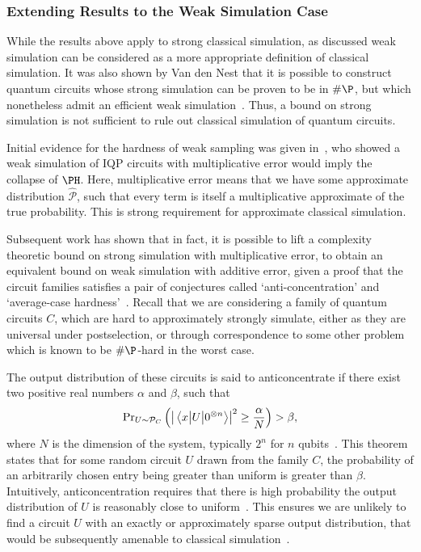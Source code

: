 \subsubsection*{Extending Results to the Weak Simulation Case}
While the results above apply to strong classical simulation, as discussed weak simulation can be considered as a more appropriate definition of classical simulation. It was also shown by Van den Nest that it is possible to construct quantum circuits whose strong simulation can be proven to be in $\#\P$, but which nonetheless admit an efficient weak simulation~\cite{VandenNest2008}. Thus, a bound on strong simulation is not sufficient to rule out classical simulation of quantum circuits.\par
Initial evidence for the hardness of weak sampling was given in~\cite{Bremner2011}, who showed a weak simulation of IQP circuits with multiplicative error would imply the collapse of $\PH$. Here, multiplicative error means that we have some approximate distribution $\hat{\mathcal{P}}$, such that every term is itself a multiplicative approximate of the true probability. This is strong requirement for approximate classical simulation.\par
Subsequent work has shown that in fact, it is possible to lift a complexity theoretic bound on strong simulation with multiplicative error, to obtain an equivalent bound on weak simulation with additive error, given a proof that the circuit families satisfies a pair of conjectures called `anti-concentration' and `average-case hardness'~\cite{Hangleiter2017}. Recall that we are considering a family of quantum circuits $C$, which are hard to approximately strongly simulate, either as they are universal under postselection, or through correspondence to some other problem which is known to be $\#\P$-hard in the worst case.\par
The output distribution of these circuits is said to anticoncentrate if there exist two positive real numbers $\alpha$ and $\beta$, such that
\begin{equation}
\text{Pr}_{U\sim \mathcal{P}_{C}}\left(\left|\matrixel{x}{U}{0^{\otimes n}}\right|^{2}\geq \frac{\alpha}{N}\right) > \beta,
\label{eq:anticoncentration}
\end{equation}
where $N$ is the dimension of the system, typically $2^{n}$ for $n$ qubits~\cite{Hangleiter2017}. This theorem states that for some random circuit $U$ drawn from the family $C$, the probability of an arbitrarily chosen entry being greater than uniform is greater than $\beta$. Intuitively, anticoncentration requires that there is high probability the output distribution of $U$ is reasonably close to uniform~\cite{Harrow2017}. This ensures we are unlikely to find a circuit $U$ with an exactly or approximately sparse output distribution, that would be subsequently amenable to classical simulation~\cite{VandenNest2008,Schwarz2013}.\par
